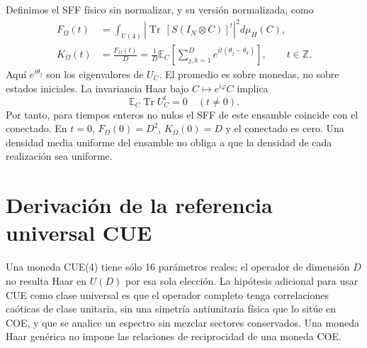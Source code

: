 \documentclass[11pt]{article}
\newcommand{\Tr}{\operatorname{Tr}}
\newcommand{\E}{\mathbb{E}}
\begin{document}
Definimos el SFF físico sin normalizar, y su versión normalizada, como
\begin{align}
 F_\Omega(t)&=\int_{U(4)}\left|\Tr\,[S(I_N\otimes C)]^t\right|^2
                         d\mu_H(C), \label{eq:exactintegral}\\
 K_\Omega(t)&=\frac{F_\Omega(t)}D
 =\frac1D\E_C\left[\sum_{j,k=1}^D e^{it(\theta_j-\theta_k)}\right],
 \qquad t\in\mathbb Z. \label{eq:k}
\end{align}
Aquí $e^{i\theta_j}$ son los eigenvalores de $U_C$. El promedio es sobre
monedas, no sobre estados iniciales. La invariancia Haar bajo
$C\mapsto e^{i\varphi}C$ implica
\begin{equation}
 \E_C\Tr U_C^t=0\quad(t\neq0).
\end{equation}
Por tanto, para tiempos enteros no nulos el SFF de este ensamble coincide
con el conectado. En $t=0$, $F_\Omega(0)=D^2$, $K_\Omega(0)=D$ y el
conectado es cero. Una densidad media uniforme del ensamble no obliga
a que la densidad de cada realización sea uniforme.

\section{Derivación de la referencia universal CUE}
Una moneda CUE(4) tiene sólo 16 parámetros reales; el operador de
dimensión $D$ no resulta Haar en $U(D)$ por esa sola elección.
La hipótesis adicional para usar CUE como clase universal es que
el operador completo tenga correlaciones caóticas de clase unitaria,
sin una simetría antiunitaria física que lo sitúe en COE, y que se
analice un espectro sin mezclar sectores conservados. Una moneda Haar
genérica no impone las relaciones de reciprocidad de una moneda COE.
\end{document}
